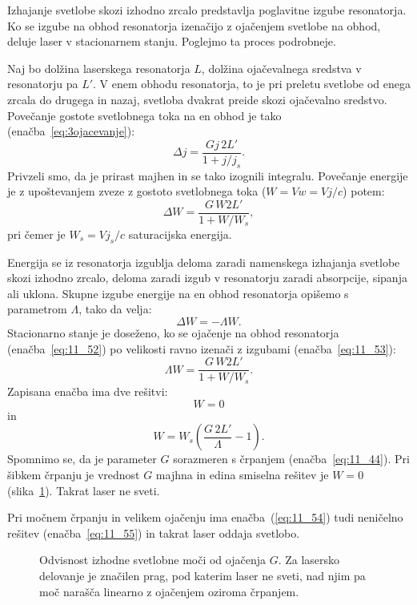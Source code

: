 Izhajanje svetlobe skozi izhodno zrcalo predstavlja poglavitne izgube 
resonatorja.  Ko se izgube na obhod resonatorja izenačijo z ojačenjem
svetlobe na obhod, deluje laser v stacionarnem stanju. Poglejmo ta proces 
podrobneje.

Naj bo dolžina laserskega resonatorja $L$, dolžina ojačevalnega sredstva 
v resonatorju pa $L'$. V enem obhodu resonatorja, to je pri preletu svetlobe
od enega zrcala do drugega in nazaj, svetloba dvakrat preide skozi ojačevalno
sredstvo. Povečanje gostote svetlobnega toka na en obhod je tako 
(enačba~\ref{eq:3ojacevanje}):
\begin{equation}
\Delta j = \frac{G j\,2L'}{1+j/j_s}.
\label{eq:11_51}
\end{equation}
Privzeli smo, da je prirast majhen in se tako izognili integralu.
Povečanje energije je z upoštevanjem zveze z gostoto
svetlobnega toka ($W = Vw = Vj/c$) potem:
\begin{equation}
\Delta W = \frac{G\,W 2L'}{1+W/W_s},
\label{eq:11_52}
\end{equation}
pri čemer je $W_s = Vj_s/c$ saturacijska energija. 

Energija se iz resonatorja izgublja deloma zaradi namenskega 
izhajanja svetlobe skozi izhodno zrcalo, deloma zaradi 
izgub v resonatorju zaradi absorpcije, sipanja ali uklona. Skupne izgube
energije na en obhod resonatorja opišemo s parametrom $\Lambda$, tako da velja:
\begin{equation}
\Delta W = -\Lambda W.
\label{eq:11_53}
\end{equation}
Stacionarno stanje je doseženo, ko se ojačenje na obhod resonatorja 
(enačba~\ref{eq:11_52}) po velikosti ravno izenači z izgubami 
(enačba~\ref{eq:11_53}):
\begin{equation}
\Lambda W = \frac{G\,W 2L'}{1+W/W_s}.
\label{eq:11_54}
\end{equation}
Zapisana enačba ima dve rešitvi:
\begin{equation}
W=0 
\label{eq:11_55a}
\end{equation}
in 
\begin{equation}
W = W_s \left(\frac{G\,2L'}{\Lambda} - 1\right)\!\!.
\label{eq:11_55}
\end{equation}
Spomnimo se, da je parameter $G$ sorazmeren s črpanjem 
(enačba~\ref{eq:11_44}). Pri šibkem črpanju je vrednost $G$ majhna in 
edina smiselna rešitev je $W=0$ (slika~\ref{fig:11_laserG}). Takrat laser ne sveti. 

Pri močnem
črpanju in velikem ojačenju ima enačba~(\ref{eq:11_54}) tudi neničelno
rešitev (enačba~\ref{eq:11_55}) in takrat laser oddaja svetlobo. 
\begin{figure}[ht!]
\centering
\def\svgwidth{70truemm} 

\caption{Odvisnost izhodne svetlobne moči od ojačenja $G$. Za lasersko
delovanje je značilen prag, pod katerim laser ne sveti, nad njim pa moč
narašča linearno z ojačenjem oziroma črpanjem.
}
\label{fig:11_laserG}
\end{figure}

